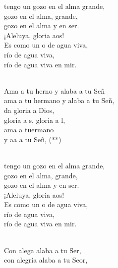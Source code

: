 \documentclass[12pt]{article}
\begin{document}
\begin{multicols*}{2}
        \begin{cancion}%
            \begin{chorus}%
             tengo un gozo en el alma grande,\\
        gozo en el alma, grande,\\
            gozo en el alma y en ser.\\
            ¡Aleluya, gloria aos!\\
            Es como un o de agua viva, \\
        río de agua viva,\\
            río de agua viva en mir. \\
            \end{chorus}%
            \jump\\
            Ama a tu herno y alaba a tu Señ \\
            ama a tu hermano y alaba a tu Señ, \\
        da gloria a Dios,\\
            gloria a s, gloria a l,\\
            ama a tuermano \\
            y aa a tu Señ, (**)\\\jump\\
            \begin{chorus}%
             tengo un gozo en el alma grande,\\
        gozo en el alma, grande,\\
            gozo en el alma y en ser.\\
            ¡Aleluya, gloria aos!\\
            Es como un o de agua viva, \\
        río de agua viva,\\
            río de agua viva en mir. \\
            \end{chorus}%
            \jump\\
            Con alega alaba a tu Ser, \\
            con alegría alaba a tu Seor,\\

\end{cancion}
\end{multicols*}
\end{document}
